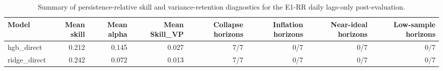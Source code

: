\begin{table}[htbp]
\centering
\caption{Summary of persistence-relative skill and variance-retention diagnostics for the E1-RR daily lags-only post-evaluation.}
\label{tab:e1_rr_variance_retention_summary}
\begin{tabular}{lrrrrrrr}
\toprule
Model & Mean skill & Mean alpha & Mean Skill\_VP & Collapse horizons & Inflation horizons & Near-ideal horizons & Low-sample horizons \\
\midrule
hgb\_direct & 0.212 & 0.145 & 0.027 & 7/7 & 0/7 & 0/7 & 0/7 \\
ridge\_direct & 0.242 & 0.072 & 0.013 & 7/7 & 0/7 & 0/7 & 0/7 \\
\bottomrule
\end{tabular}
\end{table}
